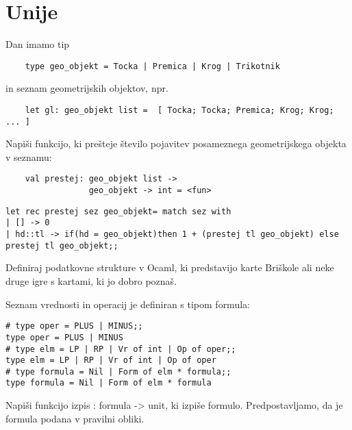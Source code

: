 \section{Unije}




\begin{ex}
Dan imamo tip 

\begin{lstlisting}
	type geo_objekt = Tocka | Premica | Krog | Trikotnik 
\end{lstlisting}
in seznam geometrijskih objektov, npr.

\begin{lstlisting}
	let gl: geo_objekt list =  [ Tocka; Tocka; Premica; Krog; Krog; ... ] 
\end{lstlisting}

Napi\v si funkcijo, ki pre\v steje \v stevilo pojavitev posameznega geometrijskega objekta v seznamu:

\begin{lstlisting}
	val prestej: geo_objekt list -> 
                 geo_objekt -> int = <fun>
\end{lstlisting}

\begin{sol}
\begin{lstlisting}
let rec prestej sez geo_objekt= match sez with
| [] -> 0
| hd::tl -> if(hd = geo_objekt)then 1 + (prestej tl geo_objekt) else prestej tl geo_objekt;;
\end{lstlisting}
\end{sol}
\end{ex}




\begin{ex}
Definiraj podatkovne strukture v Ocaml, ki predstavijo karte Bri\v skole ali neke druge igre s kartami, ki jo dobro pozna\v s.

\end{ex}
\begin{ex}
Seznam vrednosti in operacij je definiran s tipom formula: 
\begin{lstlisting}
# type oper = PLUS | MINUS;; 
type oper = PLUS | MINUS 
# type elm = LP | RP | Vr of int | Op of oper;; 
type elm = LP | RP | Vr of int | Op of oper 
# type formula = Nil | Form of elm * formula;; 
type formula = Nil | Form of elm * formula 
\end{lstlisting}

Napi\v si funkcijo izpis : formula -> unit, ki izpi\v se formulo. Predpostavljamo, da je formula podana v pravilni obliki.
\end{ex}




